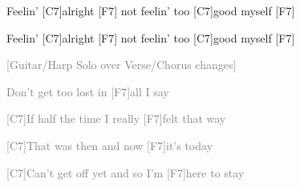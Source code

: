 \documentclass[12pt]{article}
\begin{document}
\vspace{0.00mm}

\vspace{0.00mm}
\setlength{\parindent}{0.00mm}
\setlength{\leftskip}{-12.50mm}
\setlength{\rightskip}{0.00mm}
\raggedright
Feelin' [C7]alright   [F7]  not feelin' too [C7]good myself  [F7]  
\vspace{0.00mm}

\vspace{0.00mm}
\setlength{\parindent}{0.00mm}
\setlength{\leftskip}{-12.50mm}
\setlength{\rightskip}{0.00mm}
\raggedright
Feelin' [C7]alright   [F7]  not feelin' too [C7]good myself  [F7]  
\vspace{0.00mm}

\vspace{0.00mm}
\setlength{\parindent}{0.00mm}
\setlength{\leftskip}{-12.50mm}
\setlength{\rightskip}{0.00mm}
\raggedright

\vspace{0.00mm}

\vspace{0.00mm}
\setlength{\parindent}{0.00mm}
\setlength{\leftskip}{-5.62mm}
\setlength{\rightskip}{0.00mm}
\raggedright
\textcolor{gray}{{[Guitar/Harp Solo over Verse/Chorus changes]}}
\vspace{0.00mm}

\vspace{0.00mm}
\setlength{\parindent}{0.00mm}
\setlength{\leftskip}{-5.94mm}
\setlength{\rightskip}{0.00mm}
\raggedright
\textcolor{gray}{{Don't get too lost in [F7]all I say}}
\vspace{0.00mm}

\vspace{0.00mm}
\setlength{\parindent}{0.00mm}
\setlength{\leftskip}{-5.94mm}
\setlength{\rightskip}{0.00mm}
\raggedright
\textcolor{gray}{{[C7]If half the time I really [F7]felt that way}}
\vspace{0.00mm}

\vspace{0.00mm}
\setlength{\parindent}{0.00mm}
\setlength{\leftskip}{-5.94mm}
\setlength{\rightskip}{0.00mm}
\raggedright
\textcolor{gray}{{[C7]That was then and now [F7]it's today}}
\vspace{0.00mm}

\vspace{0.00mm}
\setlength{\parindent}{0.00mm}
\setlength{\leftskip}{-5.94mm}
\setlength{\rightskip}{0.00mm}
\raggedright
\textcolor{gray}{{[C7]Can't get off yet and so I'm [F7]here to stay}}
\vspace{0.00mm}
\end{document}
